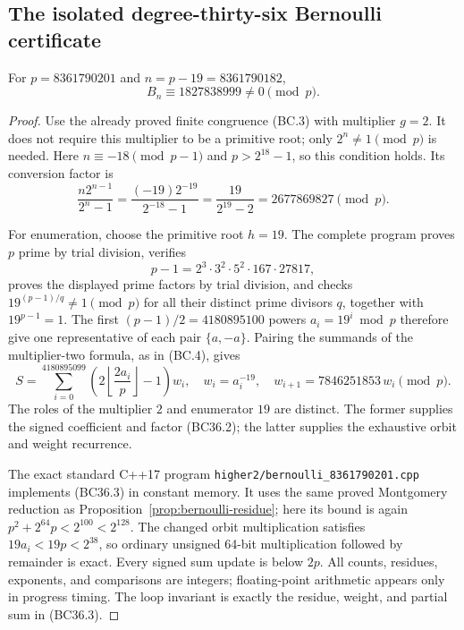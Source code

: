 \subsection{The isolated degree-thirty-six Bernoulli certificate}
\label{sec:bernoulli-residual-prime36}

\begin{proposition}[K17-BERNOULLI-8361790201]
\label{prop:bernoulli-residue36}
For $p=8361790201$ and $n=p-19=8361790182$,
\[
                         B_n\equiv1827838999\ne0\pmod p.
 \tag{BC36.1}
\]
\end{proposition}

\begin{proof}
Use the already proved finite congruence (BC.3) with multiplier $g=2$.
It does not require this multiplier to be a primitive root; only
$2^n\ne1\pmod p$ is needed.
Here $n\equiv-18\pmod{p-1}$ and $p>2^{18}-1$, so this condition
holds. Its conversion factor is
\[
 \frac{n2^{n-1}}{2^n-1}
 =\frac{(-19)2^{-19}}{2^{-18}-1}
 =\frac{19}{2^{19}-2}
 =2677869827\pmod p.
 \tag{BC36.2}
\]

For enumeration, choose the primitive root $h=19$.
The complete program proves $p$ prime by trial division, verifies
\[
 p-1=2^3\cdot3^2\cdot5^2\cdot167\cdot27817,
\]
proves the displayed prime factors by trial division, and checks
$19^{(p-1)/q}\ne1\pmod p$ for all their distinct prime divisors
$q$, together with $19^{p-1}=1$.
The first $(p-1)/2=4180895100$ powers $a_i=19^i\bmod p$
therefore give one representative of each pair $\{a,-a\}$.
Pairing the summands of the multiplier-two formula, as in (BC.4),
gives
\[
 S=\sum_{i=0}^{4180895099}
       \left(2\left\lfloor\frac{2a_i}{p}\right\rfloor-1\right)w_i,
 \quad
 w_i=a_i^{-19},\quad
 w_{i+1}=7846251853\,w_i\pmod p.
 \tag{BC36.3}
\]
The roles of the multiplier $2$ and enumerator $19$ are distinct.
The former supplies the signed coefficient and factor (BC36.2);
the latter supplies the exhaustive orbit and weight recurrence.

The exact standard C++17 program
\texttt{higher2/bernoulli\_8361790201.cpp}
implements (BC36.3) in constant memory.
It uses the same proved Montgomery reduction as
Proposition~\ref{prop:bernoulli-residue};
here its bound is again $p^2+2^{64}p<2^{100}<2^{128}$.
The changed orbit multiplication satisfies $19a_i<19p<2^{38}$,
so ordinary unsigned 64-bit multiplication followed by remainder
is exact. Every signed sum update is below $2p$.
All counts, residues, exponents, and comparisons are integers;
floating-point arithmetic appears only in progress timing.
The loop invariant is exactly the residue, weight, and partial sum
in (BC36.3).


\end{proof}
